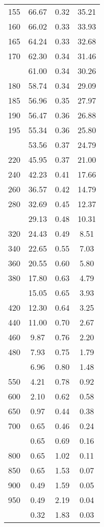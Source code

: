 \begin{table}[ht]
\begin{tabular}{lccc}
  155 & 66.67 & 0.32 & 35.21 \\ 
  160 & 66.02 & 0.33 & 33.93 \\ 
  165 & 64.24 & 0.33 & 32.68 \\ 
  170 & 62.30 & 0.34 & 31.46 \\ 
   \addlinespace
175 & 61.00 & 0.34 & 30.26 \\ 
  180 & 58.74 & 0.34 & 29.09 \\ 
  185 & 56.96 & 0.35 & 27.97 \\ 
  190 & 56.47 & 0.36 & 26.88 \\ 
  195 & 55.34 & 0.36 & 25.80 \\ 
   \addlinespace
200 & 53.56 & 0.37 & 24.79 \\ 
  220 & 45.95 & 0.37 & 21.00 \\ 
  240 & 42.23 & 0.41 & 17.66 \\ 
  260 & 36.57 & 0.42 & 14.79 \\ 
  280 & 32.69 & 0.45 & 12.37 \\ 
   \addlinespace
300 & 29.13 & 0.48 & 10.31 \\ 
  320 & 24.43 & 0.49 & 8.51 \\ 
  340 & 22.65 & 0.55 & 7.03 \\ 
  360 & 20.55 & 0.60 & 5.80 \\ 
  380 & 17.80 & 0.63 & 4.79 \\ 
   \addlinespace
400 & 15.05 & 0.65 & 3.93 \\ 
  420 & 12.30 & 0.64 & 3.25 \\ 
  440 & 11.00 & 0.70 & 2.67 \\ 
  460 & 9.87 & 0.76 & 2.20 \\ 
  480 & 7.93 & 0.75 & 1.79 \\ 
   \addlinespace
500 & 6.96 & 0.80 & 1.48 \\ 
  550 & 4.21 & 0.78 & 0.92 \\ 
  600 & 2.10 & 0.62 & 0.58 \\ 
  650 & 0.97 & 0.44 & 0.38 \\ 
  700 & 0.65 & 0.46 & 0.24 \\ 
   \addlinespace
750 & 0.65 & 0.69 & 0.16 \\ 
  800 & 0.65 & 1.02 & 0.11 \\ 
  850 & 0.65 & 1.53 & 0.07 \\ 
  900 & 0.49 & 1.59 & 0.05 \\ 
  950 & 0.49 & 2.19 & 0.04 \\ 
   \addlinespace
1000 & 0.32 & 1.83 & 0.03 \\ 
   \bottomrule
\end{tabular}
\end{table}
